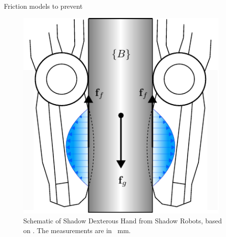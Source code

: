 Friction models to prevent 


\begin{minipage}{0.45\textwidth}
	\begin{figure}[H]
		\begin{small}
			\begin{center}
				\includegraphics[width=0.95\textwidth]{chapters/modeling/fig/friction_schematic-crop.pdf}
			\end{center}
			\caption{Schematic of Shadow Dexterous Hand from Shadow Robots, based on \cite{shadow-dex-hand-schematic}. The measurements are in \SI{}{\milli\metre}.}
			\label{fig:shadow-dex-hand-schematic}
		\end{small}
	\end{figure}
\end{minipage}



